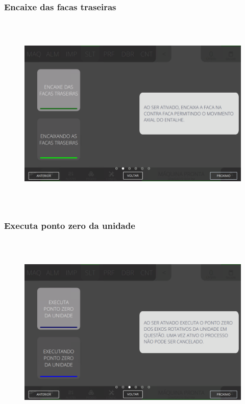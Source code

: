 \subsubsection{\small{Encaixe das facas traseiras}}\label{telaComandoSlotterEncaixeDasFacasTraseiras}
\vspace*{\fill}
\begin{figure}[h]
  \centering
  \includegraphics[width=576px,height=360px]{src/imagesMiniline/05-Slotter/Commands/e2.png}
\end{figure}
\vspace*{\fill}

\newpage
\thispagestyle{fancy}
\vspace*{40 pt}
\subsubsection{\small{Executa ponto zero da unidade}}\label{telaComandoSlotterExecutaPontoZeroDaUnidade}
\vspace*{\fill}
\begin{figure}[h]
  \centering
  \includegraphics[width=576px,height=360px]{src/imagesMiniline/05-Slotter/Commands/e3.png}
\end{figure}
\vspace*{\fill}


